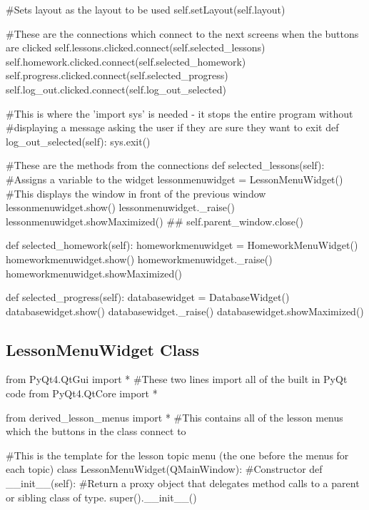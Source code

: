 \begin{landscape}
\begin{python}
        #Sets layout as the layout to be used
        self.setLayout(self.layout)

        #These are the connections which connect to the next screens when the buttons are clicked
        self.lessons.clicked.connect(self.selected_lessons)
        self.homework.clicked.connect(self.selected_homework)
        self.progress.clicked.connect(self.selected_progress)
        self.log_out.clicked.connect(self.log_out_selected)

    #This is where the 'import sys' is needed - it stops the entire program without
    #displaying a message asking the user if they are sure they want to exit
    def log_out_selected(self):
        sys.exit()

    #These are the methods from the connections
    def selected_lessons(self):
        #Assigns a variable to the widget
        lessonmenuwidget = LessonMenuWidget()
        #This displays the window in front of the previous window
        lessonmenuwidget.show()
        lessonmenuwidget._raise()
        lessonmenuwidget.showMaximized()
##        self.parent_window.close()

    def selected_homework(self):
        homeworkmenuwidget = HomeworkMenuWidget()
        homeworkmenuwidget.show()
        homeworkmenuwidget._raise()
        homeworkmenuwidget.showMaximized()

    def selected_progress(self):
        databasewidget = DatabaseWidget()
        databasewidget.show()
        databasewidget._raise()
        databasewidget.showMaximized() 
\end{python}

\subsection{LessonMenuWidget Class}

\begin{python}
from PyQt4.QtGui import * #These two lines import all of the built in PyQt code
from PyQt4.QtCore import *

from derived_lesson_menus import * #This contains all of the lesson menus which the buttons in the class connect to

#This is the template for the lesson topic menu (the one before the menus for each topic)
class LessonMenuWidget(QMainWindow):
    #Constructor
    def __init__(self):
        #Return a proxy object that delegates method calls to a parent or sibling class of type.
        super().__init__()


\end{python}
\end{landscape}
